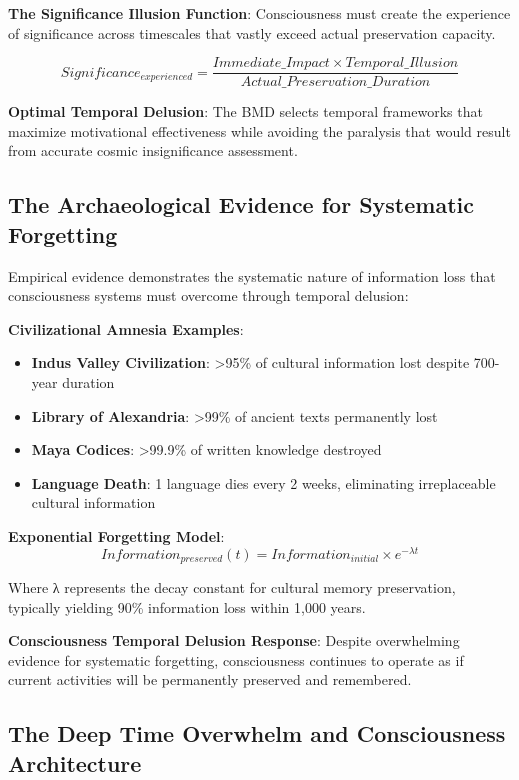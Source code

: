 \documentclass[12pt]{article}
\begin{document}
\textbf{The Significance Illusion Function}: Consciousness must create the experience of significance across timescales that vastly exceed actual preservation capacity.

$$Significance_{experienced} = \frac{Immediate\_Impact \times Temporal\_Illusion}{Actual\_Preservation\_Duration}$$

\textbf{Optimal Temporal Delusion}: The BMD selects temporal frameworks that maximize motivational effectiveness while avoiding the paralysis that would result from accurate cosmic insignificance assessment.

\subsection{The Archaeological Evidence for Systematic Forgetting}

Empirical evidence demonstrates the systematic nature of information loss that consciousness systems must overcome through temporal delusion:

\textbf{Civilizational Amnesia Examples}:
\begin{itemize}
\item \textbf{Indus Valley Civilization}: >95\% of cultural information lost despite 700-year duration
\item \textbf{Library of Alexandria}: >99\% of ancient texts permanently lost
\item \textbf{Maya Codices}: >99.9\% of written knowledge destroyed
\item \textbf{Language Death}: 1 language dies every 2 weeks, eliminating irreplaceable cultural information
\end{itemize}

\textbf{Exponential Forgetting Model}:
$$Information_{preserved}(t) = Information_{initial} \times e^{-\lambda t}$$

Where λ represents the decay constant for cultural memory preservation, typically yielding 90\% information loss within 1,000 years.

\textbf{Consciousness Temporal Delusion Response}: Despite overwhelming evidence for systematic forgetting, consciousness continues to operate as if current activities will be permanently preserved and remembered.

\subsection{The Deep Time Overwhelm and Consciousness Architecture}
\end{document}
